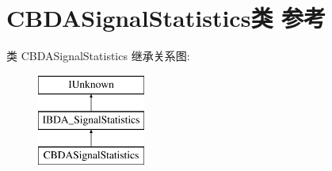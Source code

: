 \hypertarget{class_c_b_d_a_signal_statistics}{}\section{C\+B\+D\+A\+Signal\+Statistics类 参考}
\label{class_c_b_d_a_signal_statistics}
类 C\+B\+D\+A\+Signal\+Statistics 继承关系图\+:\begin{figure}[H]
\begin{center}
\leavevmode
\includegraphics[height=3.000000cm]{class_c_b_d_a_signal_statistics}
\end{center}
\end{figure}
